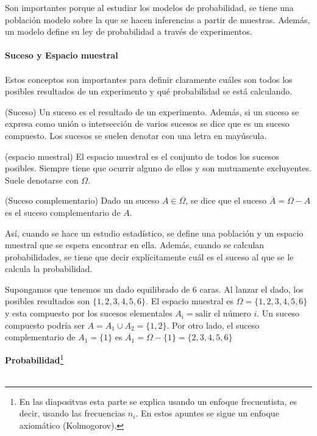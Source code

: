 Son importantes porque al estudiar los modelos de probabilidad, se tiene una población modelo sobre la que se hacen inferencias a partir de muestras. Además, un modelo define su ley de probabilidad a través de experimentos.
\\\\\textbf{Suceso y Espacio muestral}\\\\
Estos conceptos son importantes para definir claramente cuáles son todos los posibles resultados de un experimento y qué probabilidad se está calculando.
\begin{definition}(Suceso)
	Un suceso es el resultado de un experimento. Además, si un suceso se expresa como unión o intersección de varios sucesos se dice que es un suceso compuesto. Los sucesos se suelen denotar con una letra en mayúscula.
	\label{def:suceso_el}
\end{definition}
\begin{definition}(espacio muestral)
	El espacio muestral es el conjunto de todos los sucesos posibles. Siempre tiene que ocurrir alguno de ellos y son mutuamente excluyentes. Suele denotarse con $\Omega$.
	\label{def:espacio_sucesos}
\end{definition}
\begin{definition}(Suceso complementario)
	Dado un suceso $A \in \Omega$, se dice que el suceso $\overline{A} = \Omega - A$ es el suceso complementario de $A$.
	\label{def: suceso complementario}
\end{definition}
Así, cuando se hace un estudio estadístico, se define una población y un espacio muestral que se espera encontrar en ella. Además, cuando se calculan probabilidades, se tiene que decir explícitamente cuál es el suceso al que se le calcula la probabilidad.
\begin{example}
Supongamos que tenemos un dado equilibrado de 6 caras. Al lanzar el dado, los posibles resultados son $\lbrace 1,2,3,4,5,6\rbrace$. El espacio muestral es $\Omega = \lbrace 1,2,3,4,5,6\rbrace$ y esta compuesto por los sucesos elementales $A_i = \textrm{salir el número } i$. Un suceso compuesto podría ser $A = A_1 \cup A_2 = \lbrace 1,2\rbrace$. Por otro lado, el suceso complementario de $A_1 = \lbrace 1\rbrace$ es $\overline{A_1} = \Omega - \lbrace 1\rbrace = \lbrace 2,3,4,5,6\rbrace$\label{ex: espacio_sucesos}
\end{example}
\textbf{Probabilidad}\footnote{En las diapositvas esta parte se explica usando un enfoque frecuentista, es decir, usando las frecuencias $n_i$. En estos apuntes se sigue un enfoque axiomático (Kolmogorov).}\\\\
